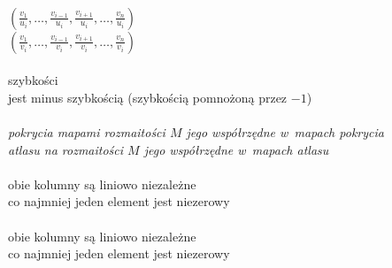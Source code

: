\documentclass[a4paper,11pt]{article}
\begin{document}
\noindent
{} \\[0.3em]
\Jest
$( \frac{ v_{ 1 } }{ u_{ i } }, \ldots, \frac{ v_{ i - 1 } }{ u_{ i } },
\frac{ v_{ i + 1 } }{ u_{ i } }, \ldots, \frac{ v_{ n } }{ u_{ i } } )$ \\[0.5em]
\Powin
$\left( \frac{ v_{ 1 } }{ v_{ i } }, \ldots, \frac{ v_{ i - 1 } }{ v_{ i } },
  \frac{ v_{ i + 1 } }{ v_{ i } }, \ldots, \frac{ v_{ n } }{ v_{ i } } \right)$
\\[0.5em]
 \\
\Jest  szybkości \\
\Powin jest minus szybkością (szybkością pomnożoną przez $-1$) \\
 \\
\Jest  \textit{pokrycia mapami rozmaitości $M$ jego współrzędne
  w~mapach pokrycia} \\
\Powin \textit{atlasu na rozmaitości $M$ jego współrzędne
  w~mapach atlasu} \\
 \\
\Jest  obie kolumny są liniowo niezależne \\
\Powin co najmniej jeden element jest niezerowy \\
 \\
\Jest  obie kolumny są liniowo niezależne \\
\Powin co najmniej jeden element jest niezerowy \\
\end{document}
